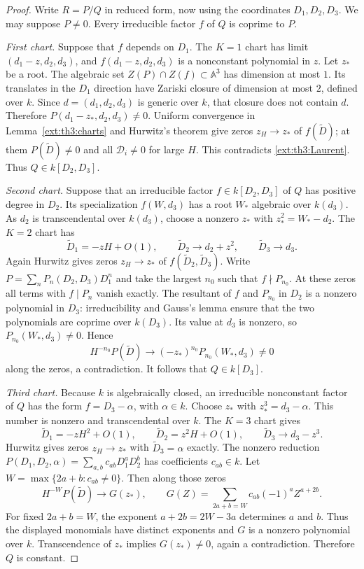 \documentclass[11pt,a4paper]{article}
\theoremstyle{definition}\newtheorem{definition}[theorem]{Definition}
\theoremstyle{remark}\newtheorem{remark}[theorem]{Remark}
\begin{document}
\begin{proof}
Write $R=P/Q$ in reduced form, now using the coordinates $D_1,D_2,D_3$.
We may suppose $P\ne0$.  Every irreducible factor $f$ of $Q$ is coprime
to $P$.

\emph{First chart.}
Suppose that $f$ depends on $D_1$.  The $K=1$ chart has limit
$(d_1-z,d_2,d_3)$, and
$f(d_1-z,d_2,d_3)$ is a nonconstant polynomial in $z$.
Let $z_*$ be a root.  The algebraic set $Z(P)\cap Z(f)\subset\mathbb A^3$
has dimension at most $1$.  Its translates in the $D_1$ direction have
Zariski closure of dimension at most $2$, defined over $k$.
Since $d=(d_1,d_2,d_3)$ is generic over $k$, that closure does not contain
$d$.  Therefore $P(d_1-z_*,d_2,d_3)\ne0$.
Uniform convergence in Lemma~\ref{ext:th3:charts} and Hurwitz's theorem
give zeros $z_H\to z_*$ of $f(\widetilde D)$; at them $P(\widetilde D)\ne0$
and all $\mathcal D_i\ne0$ for large $H$.  This contradicts
\eqref{ext:th3:Laurent}.  Thus $Q\in k[D_2,D_3]$.

\emph{Second chart.}
Suppose that an irreducible factor $f\in k[D_2,D_3]$ of $Q$ has positive
degree in $D_2$.  Its specialization $f(W,d_3)$ has a root $W_*$ algebraic
over $k(d_3)$.  As $d_2$ is transcendental over $k(d_3)$, choose a nonzero
$z_*$ with $z_*^2=W_*-d_2$.  The $K=2$ chart has
\[
 \widetilde D_1=-zH+O(1),\qquad
 \widetilde D_2\longrightarrow d_2+z^2,\qquad
 \widetilde D_3\longrightarrow d_3.
\]
Again Hurwitz gives zeros $z_H\to z_*$ of $f(\widetilde D_2,\widetilde D_3)$.
Write $P=\sum_n P_n(D_2,D_3)D_1^n$ and take the largest $n_0$ such that
$f\nmid P_{n_0}$.  At these zeros all terms with $f\mid P_n$ vanish
exactly.  The resultant of $f$ and $P_{n_0}$ in $D_2$ is a nonzero
polynomial in $D_3$: irreducibility and Gauss's lemma ensure that the
two polynomials are coprime over $k(D_3)$.  Its value at $d_3$ is nonzero,
so $P_{n_0}(W_*,d_3)\ne0$.  Hence
\[
 H^{-n_0}P(\widetilde D)\longrightarrow
 (-z_*)^{n_0}P_{n_0}(W_*,d_3)\ne0
\]
along the zeros, a contradiction.  It follows that $Q\in k[D_3]$.

\emph{Third chart.}
Because $k$ is algebraically closed, an irreducible nonconstant factor
of $Q$ has the form $f=D_3-\alpha$, with $\alpha\in k$.
Choose $z_*$ with $z_*^3=d_3-\alpha$.  This number is nonzero and
transcendental over $k$.  The $K=3$ chart gives
\[
 \widetilde D_1=-zH^2+O(1),\qquad
 \widetilde D_2=z^2H+O(1),\qquad
 \widetilde D_3\longrightarrow d_3-z^3.
\]
Hurwitz gives zeros $z_H\to z_*$ with $\widetilde D_3=\alpha$ exactly.
The nonzero reduction $P(D_1,D_2,\alpha)=\sum_{a,b}c_{ab}D_1^aD_2^b$
has coefficients $c_{ab}\in k$.  Let
$W=\max\{2a+b:c_{ab}\ne0\}$.  Then along those zeros
\[
 H^{-W}P(\widetilde D)\longrightarrow
 G(z_*),\qquad
 G(Z)=\sum_{2a+b=W}c_{ab}(-1)^aZ^{a+2b}.
\]
For fixed $2a+b=W$, the exponent $a+2b=2W-3a$ determines $a$ and $b$.
Thus the displayed monomials have distinct exponents and $G$ is a nonzero
polynomial over $k$.  Transcendence of $z_*$ implies $G(z_*)\ne0$,
again a contradiction.  Therefore $Q$ is constant.
\end{proof}
\end{document}
